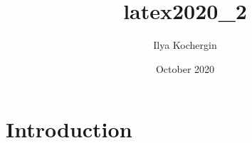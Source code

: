 \documentclass{article}
\title{latex2020_2}
\author{Ilya Kochergin}
\date{October 2020}
\begin{document}

\section{Introduction}






\end{document}
